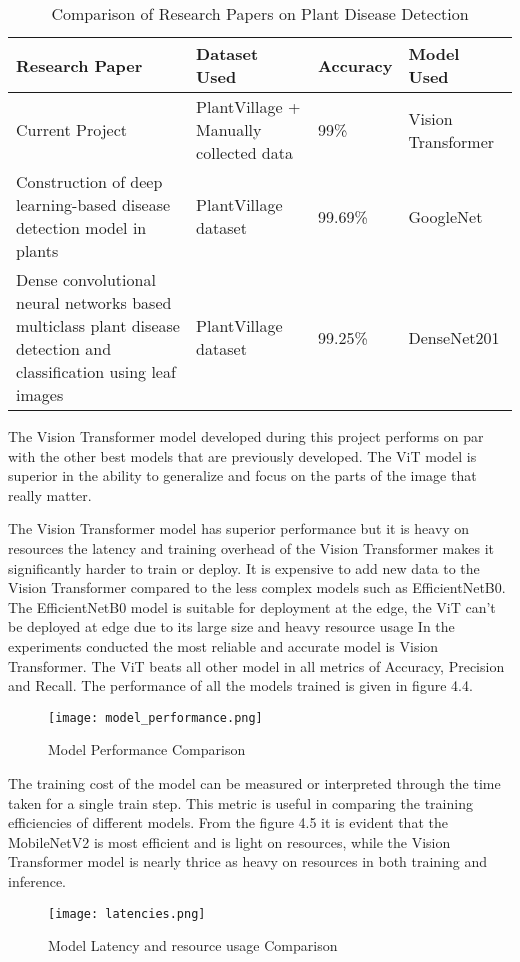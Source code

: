 \begin{table}[h!]
    \centering
    \begin{tabular}{|m{5cm}|m{4cm}|m{3cm}|m{3cm}|}
    \hline
    \textbf{Research Paper} & \textbf{Dataset Used} & \textbf{Accuracy} & \textbf{Model Used} \\ \hline
    Current Project & PlantVillage + Manually collected data & 99\% & Vision Transformer \\ \hline
    Construction of deep learning-based disease detection model in plants & PlantVillage dataset & 99.69\% & GoogleNet \\ \hline
    Dense convolutional neural networks based multiclass plant disease detection and classification using leaf images & PlantVillage dataset & 99.25\% & DenseNet201 \\ \hline
    \end{tabular}
    \caption{Comparison of Research Papers on Plant Disease Detection}
    \label{tab:plant_disease}
\end{table}

The Vision Transformer model developed during this project performs on par with the other best models that are previously developed. The ViT model is superior in the ability to generalize and focus on the parts of the image that really matter. 

The Vision Transformer model has superior performance but it is heavy on resources the latency and training overhead of the Vision Transformer makes it significantly harder to train or deploy. It is expensive to add new data to the Vision Transformer compared to the less complex models such as EfficientNetB0. The EfficientNetB0 model is suitable for deployment at the edge, the ViT can't be deployed at edge due to its large size and heavy resource usage In the experiments conducted the most reliable and accurate model is Vision Transformer. The ViT beats all other model in all metrics of Accuracy, Precision and Recall. The performance of all the models trained is given in figure 4.4.

\begin{figure}[h!]
    \centering
    \texttt{[image: model\_performance.png]}
    \caption{Model Performance Comparison}
    \label{fig:model_performance}
\end{figure}


The training cost of the model can be measured or interpreted through the time taken for a single train step. This metric is useful in comparing the training efficiencies of different models. From the figure 4.5 it is evident that the MobileNetV2 is most efficient and is light on resources, while the Vision Transformer model is nearly thrice as heavy on resources in both training and inference. 

\begin{figure}[h!]
    \centering
    \texttt{[image: latencies.png]}
    \caption{Model Latency and resource usage Comparison}
    \label{fig:latency}
\end{figure}